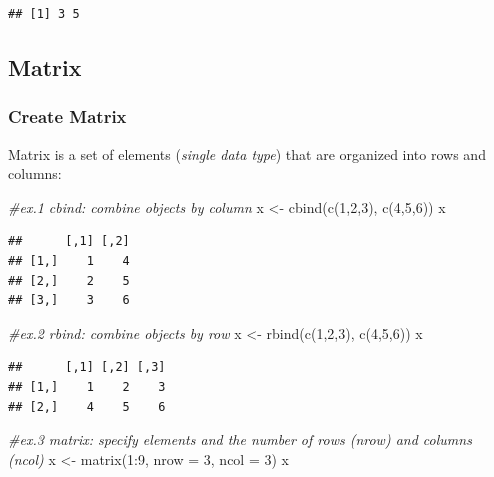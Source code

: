 \documentclass[
]{article}
\newenvironment{Shaded}{\begin{snugshade}}{\end{snugshade}}
\newcommand{\AttributeTok}[1]{\textcolor[rgb]{0.77,0.63,0.00}{#1}}
\newcommand{\CommentTok}[1]{\textcolor[rgb]{0.56,0.35,0.01}{\textit{#1}}}
\newcommand{\DecValTok}[1]{\textcolor[rgb]{0.00,0.00,0.81}{#1}}
\newcommand{\FunctionTok}[1]{\textcolor[rgb]{0.00,0.00,0.00}{#1}}
\newcommand{\NormalTok}[1]{#1}
\newcommand{\OtherTok}[1]{\textcolor[rgb]{0.56,0.35,0.01}{#1}}
\newcommand{\SpecialCharTok}[1]{\textcolor[rgb]{0.00,0.00,0.00}{#1}}
\begin{document}
\begin{verbatim}
## [1] 3 5
\end{verbatim}

\hypertarget{matrix}{%
\subsection{Matrix}\label{matrix}}

\hypertarget{create-matrix}{%
\subsubsection{Create Matrix}\label{create-matrix}}

Matrix is a set of elements (\emph{single data type}) that are organized into rows and columns:

\begin{Shaded}
\begin{Highlighting}[]
\CommentTok{\#ex.1 cbind: combine objects by column}
\NormalTok{x }\OtherTok{\textless{}{-}} \FunctionTok{cbind}\NormalTok{(}\FunctionTok{c}\NormalTok{(}\DecValTok{1}\NormalTok{,}\DecValTok{2}\NormalTok{,}\DecValTok{3}\NormalTok{), }\FunctionTok{c}\NormalTok{(}\DecValTok{4}\NormalTok{,}\DecValTok{5}\NormalTok{,}\DecValTok{6}\NormalTok{))}
\NormalTok{x}
\end{Highlighting}
\end{Shaded}

\begin{verbatim}
##      [,1] [,2]
## [1,]    1    4
## [2,]    2    5
## [3,]    3    6
\end{verbatim}

\begin{Shaded}
\begin{Highlighting}[]
\CommentTok{\#ex.2 rbind: combine objects by row}
\NormalTok{x }\OtherTok{\textless{}{-}} \FunctionTok{rbind}\NormalTok{(}\FunctionTok{c}\NormalTok{(}\DecValTok{1}\NormalTok{,}\DecValTok{2}\NormalTok{,}\DecValTok{3}\NormalTok{), }\FunctionTok{c}\NormalTok{(}\DecValTok{4}\NormalTok{,}\DecValTok{5}\NormalTok{,}\DecValTok{6}\NormalTok{))}
\NormalTok{x}
\end{Highlighting}
\end{Shaded}

\begin{verbatim}
##      [,1] [,2] [,3]
## [1,]    1    2    3
## [2,]    4    5    6
\end{verbatim}

\begin{Shaded}
\begin{Highlighting}[]
\CommentTok{\#ex.3 matrix: specify elements and the number of rows (nrow) and columns (ncol)}
\NormalTok{x }\OtherTok{\textless{}{-}} \FunctionTok{matrix}\NormalTok{(}\DecValTok{1}\SpecialCharTok{:}\DecValTok{9}\NormalTok{, }\AttributeTok{nrow =} \DecValTok{3}\NormalTok{, }\AttributeTok{ncol =} \DecValTok{3}\NormalTok{)}
\NormalTok{x}
\end{Highlighting}
\end{Shaded}
\end{document}

